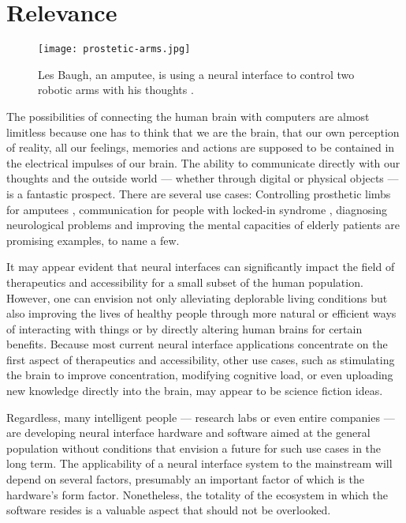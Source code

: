 
\section{Relevance}
\label{chapter1-relevance}

\begin{figure}
  \centering
  \texttt{[image: prostetic-arms.jpg]}
  \caption{Les Baugh, an amputee, is using a neural interface to control two robotic arms with his thoughts \citep{campbell_amputee_2014}.}
  \label{fig:prostetic-arms}
\end{figure}

The possibilities of connecting the human brain with computers are almost limitless because one has to think that we are the brain, that our own perception of reality, all our feelings, memories and actions are supposed to be contained in the electrical impulses of our brain. The ability to communicate directly with our thoughts and the outside world — whether through digital or physical objects — is a fantastic prospect. There are several use cases: Controlling prosthetic limbs for amputees \citep{murphy_electroencephalogram-based_2017}, communication for people with locked-in syndrome \citep{chaudhary_spelling_2022}, diagnosing neurological problems and improving the mental capacities of elderly patients \citep{belkacem_brain_2020} are promising examples, to name a few.

It may appear evident that neural interfaces can significantly impact the field of therapeutics and accessibility for a small subset of the human population. However, one can envision not only alleviating deplorable living conditions but also improving the lives of healthy people through more natural or efficient ways of interacting with things or by directly altering human brains for certain benefits. Because most current neural interface applications concentrate on the first aspect of therapeutics and accessibility, other use cases, such as stimulating the brain to improve concentration, modifying cognitive load, or even uploading new knowledge directly into the brain, may appear to be science fiction ideas.

Regardless, many intelligent people — research labs or even entire companies — are developing neural interface hardware and software aimed at the general population without conditions that envision a future for such use cases in the long term. The applicability of a neural interface system to the mainstream will depend on several factors, presumably an important factor of which is the hardware's form factor. Nonetheless, the totality of the ecosystem in which the software resides is a valuable aspect that should not be overlooked.

